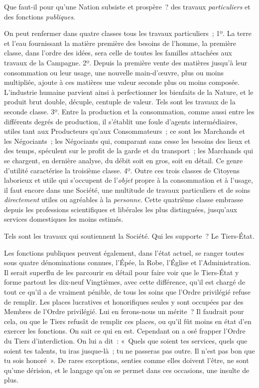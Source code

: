 \documentclass[french,twoside]{book} %
\newcommand\chaptercont{} %
\begin{document}
\chaptercont
\noindent Que faut-il pour qu’une Nation subsiste et prospère ? des travaux {\itshape particuliers} et des fonctions {\itshape publiques}.\par
On peut renfermer dans quatre classes tous les travaux particuliers ; 1º. La terre et l’eau fournissant la matière première des besoins de l’homme, la première classe, dans l’ordre des idées, sera celle de toutes les familles attachées aux travaux de la Campagne. 2º. Depuis la première vente des matières jusqu’à leur consommation ou leur usage, une nouvelle main-d’œuvre, plus ou moins multipliée, ajoute à ces matières une valeur seconde plus ou moins composée. L’industrie humaine parvient ainsi à perfectionner les bienfaits de la Nature, et le produit brut double, décuple, centuple de valeur. Tels sont les travaux de la seconde classe. 3º. Entre la production et la consommation, comme aussi entre les différents degrés de production, il s’établit une foule d’agents intermédiaires, utiles tant aux Producteurs qu’aux Consommateurs ; ce sont les Marchands et les Négociants ; les Négociants qui, comparant sans cesse les besoins des lieux et des temps, spéculent sur le profit de la garde et du transport ; les Marchands qui se chargent, en dernière analyse, du débit soit en gros, soit en détail. Ce genre d’utilité caractérise la troisième classe. 4º. Outre ces trois classes de Citoyens laborieux et utile qui s’occupent de l’{\itshape objet} propre à la consommation et à l’usage, il faut encore dans une Société, une multitude de travaux particuliers et de soins {\itshape directement} utiles ou agréables à la {\itshape personne}. Cette quatrième classe embrasse depuis les professions scientifiques et libérales les plus distinguées, jusqu’aux services domestiques les moins estimés.\par
Tels sont les travaux qui soutiennent la Société. Qui les supporte ? Le Tiers-État.\par
Les fonctions publiques peuvent également, dans l’état actuel, se ranger toutes sous quatre dénominations connues, l’Épée, la Robe, l’Église et l’Administration. Il serait superflu de les parcourir en détail pour faire voir que le Tiers-État y forme partout les dix-neuf Vingtièmes, avec cette différence, qu’il est chargé de tout ce qu’il a de vraiment pénible, de tous les soins que l’Ordre privilégié refuse de remplir. Les places lucratives et honorifiques seules y sont occupées par des Membres de l’Ordre privilégié. Lui en ferons-nous un mérite ? Il faudrait pour cela, ou que le Tiers refusât de remplir ces places, ou qu’il fût moins en état d’en exercer les fonctions. On sait ce qui en est. Cependant on a osé frapper l’Ordre du Tiers d’interdiction. On lui a dit : « Quels que soient tes services, quels que soient tes talents, tu iras jusque-là ; tu ne passeras pas outre. Il n’est pas bon que tu sois honoré ». De rares exceptions, senties comme elles doivent l’être, ne sont qu’une dérision, et le langage qu’on se permet dans ces occasions, une insulte de plus.\par
\end{document}

